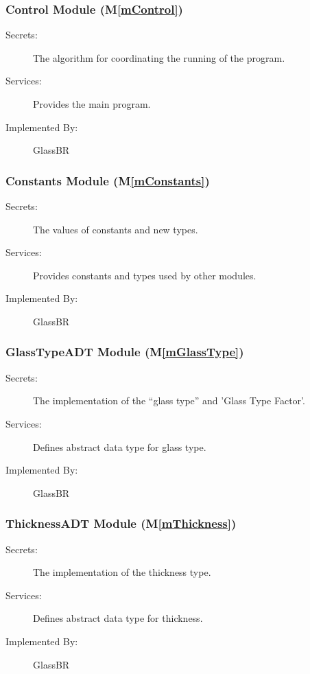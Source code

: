 \documentclass[12pt]{article}
\newcommand{\mref}[1]{M\ref{#1}}
\newcommand{\progname}{GlassBR}
\begin{document}
\subsubsection{Control Module (\mref{mControl})}

\begin{description}
\item[Secrets:] The algorithm for coordinating the running of the program.
\item[Services:] Provides the main program.
\item[Implemented By:] \progname{}
\end{description}

\subsubsection{Constants Module (\mref{mConstants})}

\begin{description}
\item[Secrets:] The values of constants and new types.
\item[Services:] Provides constants and types used by other modules.
\item[Implemented By:] \progname{}
\end{description}

\subsubsection{GlassTypeADT Module (\mref{mGlassType})}

\begin{description}
\item[Secrets:] The implementation of the ``glass type'' and 'Glass Type Factor'.
\item[Services:] Defines abstract data type for glass type.
\item[Implemented By:] \progname{}
\end{description}

\subsubsection{ThicknessADT Module (\mref{mThickness})}

\begin{description}
\item[Secrets:] The implementation of the thickness type.
\item[Services:]  Defines abstract data type for thickness.
\item[Implemented By:] \progname{}
\end{description}
\end{document}
